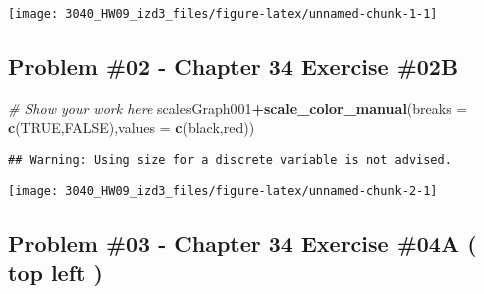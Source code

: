 \documentclass[
]{article}
\newenvironment{Shaded}{\begin{snugshade}}{\end{snugshade}}
\newcommand{\AttributeTok}[1]{\textcolor[rgb]{0.13,0.29,0.53}{#1}}
\newcommand{\CommentTok}[1]{\textcolor[rgb]{0.56,0.35,0.01}{\textit{#1}}}
\newcommand{\FunctionTok}[1]{\textcolor[rgb]{0.13,0.29,0.53}{\textbf{#1}}}
\newcommand{\NormalTok}[1]{#1}
\newcommand{\SpecialCharTok}[1]{\textcolor[rgb]{0.81,0.36,0.00}{\textbf{#1}}}
\newcommand{\StringTok}[1]{\textcolor[rgb]{0.31,0.60,0.02}{#1}}
\begin{document}
\texttt{[image: 3040\_HW09\_izd3\_files/figure-latex/unnamed-chunk-1-1]}

\newpage

\hypertarget{problem-02---chapter-34-exercise-02b}{%
\subsection{Problem \#02 - Chapter 34 Exercise
\#02B}\label{problem-02---chapter-34-exercise-02b}}

\begin{Shaded}
\begin{Highlighting}[]
\CommentTok{\# Show your work here}
\NormalTok{scalesGraph001}\SpecialCharTok{+}\FunctionTok{scale\_color\_manual}\NormalTok{(}\AttributeTok{breaks =} \FunctionTok{c}\NormalTok{(}\StringTok{\textquotesingle{}TRUE\textquotesingle{}}\NormalTok{,}\StringTok{\textquotesingle{}FALSE\textquotesingle{}}\NormalTok{),}\AttributeTok{values =} \FunctionTok{c}\NormalTok{(}\StringTok{\textquotesingle{}black\textquotesingle{}}\NormalTok{,}\StringTok{\textquotesingle{}red\textquotesingle{}}\NormalTok{))}
\end{Highlighting}
\end{Shaded}

\begin{verbatim}
## Warning: Using size for a discrete variable is not advised.
\end{verbatim}

\texttt{[image: 3040\_HW09\_izd3\_files/figure-latex/unnamed-chunk-2-1]}

\newpage

\hypertarget{problem-03---chapter-34-exercise-04a-top-left}{%
\subsection{Problem \#03 - Chapter 34 Exercise \#04A ( top left
)}\label{problem-03---chapter-34-exercise-04a-top-left}}
\end{document}
